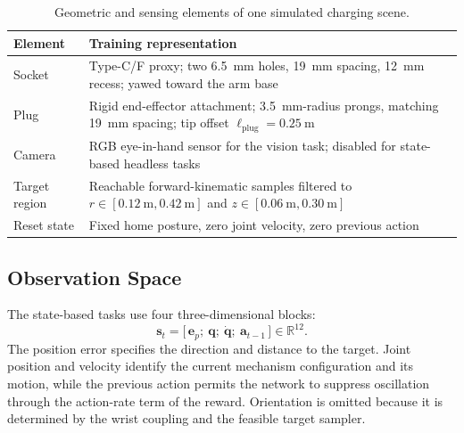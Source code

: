 \begin{table}[!ht]
\centering
\caption{Geometric and sensing elements of one simulated charging scene.}
\label{rl:tab:rl-scene}
\small
\setlength{\tabcolsep}{3pt}
\begin{tabular}{@{}p{}p{}@{}}
\toprule
Element & Training representation \\
\midrule
Socket & Type-C/F proxy; two \SI{6.5}{\milli\meter} holes, \SI{19}{\milli\meter} spacing, \SI{12}{\milli\meter} recess; yawed toward the arm base \\
Plug & Rigid end-effector attachment; \SI{3.5}{\milli\meter}-radius prongs, matching \SI{19}{\milli\meter} spacing; tip offset $\ell_{\mathrm{plug}}=\SI{0.25}{\meter}$ \\
Camera & RGB eye-in-hand sensor for the vision task; disabled for state-based headless tasks \\
Target region & Reachable forward-kinematic samples filtered to $r\in[\SI{0.12}{\meter},\SI{0.42}{\meter}]$ and $z\in[\SI{0.06}{\meter},\SI{0.30}{\meter}]$ \\
Reset state & Fixed home posture, zero joint velocity, zero previous action \\
\bottomrule
\end{tabular}
\end{table}

\rlFloatBarrier

\subsection{Observation Space}\label{rl:sec:rl-obs}

The state-based tasks use four three-dimensional blocks:
\begin{equation}
\label{rl:eq:rl-obs}
\bm{s}_t=\big[\,\bm{e}_p;\ \bm{q};\ \dot{\bm{q}};\ \bm{a}_{t-1}\,\big]\in\mathbb{R}^{12}.
\end{equation}
The position error specifies the direction and distance to the target. Joint position and velocity identify the current mechanism configuration and its motion, while the previous action permits the network to suppress oscillation through the action-rate term of the reward. Orientation is omitted because it is determined by the wrist coupling and the feasible target sampler.

